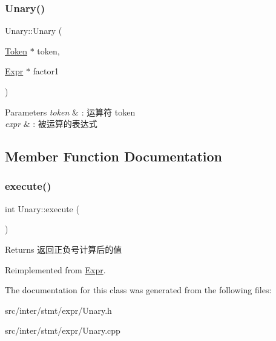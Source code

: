 \subsubsection{\texorpdfstring{Unary()}{Unary()}}
{\footnotesize\ttfamily Unary\+::\+Unary (\begin{DoxyParamCaption}\item[{\hyperlink{class_token}{Token} $\ast$}]{token,  }\item[{\hyperlink{class_expr}{Expr} $\ast$}]{factor1 }\end{DoxyParamCaption})}


\begin{DoxyParams}{Parameters}
{\em token} & \+: 运算符 token \\
\hline
{\em expr} & \+: 被运算的表达式 \\
\hline
\end{DoxyParams}


\subsection{Member Function Documentation}
\mbox{\label{class_unary_af42edff1ee4718a9afeb7127e41af758}} 
\subsubsection{\texorpdfstring{execute()}{execute()}}
{\footnotesize\ttfamily int Unary\+::execute (\begin{DoxyParamCaption}{ }\end{DoxyParamCaption})\hspace{0.3cm}{\ttfamily [virtual]}}

\begin{DoxyReturn}{Returns}
返回正负号计算后的值 
\end{DoxyReturn}


Reimplemented from \hyperlink{class_expr_aff6a2e6eaa460e2a3db28ebdab089b51}{Expr}.



The documentation for this class was generated from the following files\+:\begin{DoxyCompactItemize}
\item 
src/inter/stmt/expr/Unary.\+h\item 
src/inter/stmt/expr/Unary.\+cpp\end{DoxyCompactItemize}
